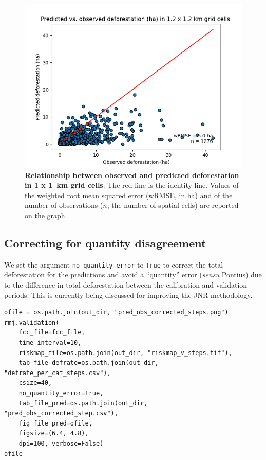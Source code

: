 \documentclass[paper=a4, 12pt, DIV=12]{scrartcl}
\begin{document}
\begin{figure}[H]
\centering
\includegraphics[width=0.8\linewidth]{outputs/pred_obs_steps.png}
\caption{\label{fig:orgc59b632}\textbf{Relationship between observed and predicted deforestation in 1 x 1 km grid cells}. The red line is the identity line. Values of the weighted root mean squared error (wRMSE, in ha) and of the number of observations (\(n\), the number of spatial cells) are reported on the graph.}
\end{figure}

\subsection{Correcting for quantity disagreement}
\label{sec:org159d3da}

We set the argument \texttt{no\_quantity\_error} to \texttt{True} to correct the total deforestation for the predictions and avoid a ``quantity'' error (\emph{sensu} Pontius) due to the difference in total deforestation between the calibration and validation periods. This is currently being discussed for improving the JNR methodology.

\begin{verbatim}
ofile = os.path.join(out_dir, "pred_obs_corrected_steps.png")
rmj.validation(
    fcc_file=fcc_file,
    time_interval=10,
    riskmap_file=os.path.join(out_dir, "riskmap_v_steps.tif"),
    tab_file_defrate=os.path.join(out_dir, "defrate_per_cat_steps.csv"),
    csize=40,
    no_quantity_error=True,
    tab_file_pred=os.path.join(out_dir, "pred_obs_corrected_step.csv"),
    fig_file_pred=ofile,
    figsize=(6.4, 4.8),
    dpi=100, verbose=False)
ofile
\end{verbatim}
\end{document}
